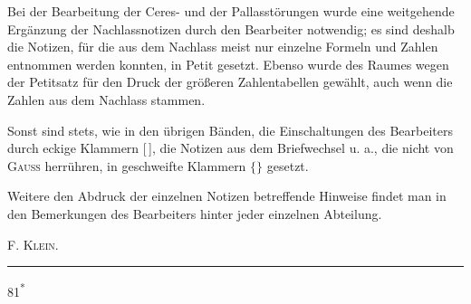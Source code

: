 \par\noindent\hspace*{\parindent}Bei der Bearbeitung der Ceres- und der Pallasstörungen wurde eine weitgehende Ergänzung der
Nachlassnotizen durch den Bearbeiter notwendig; es sind deshalb die Notizen, für die aus dem Nachlass
meist nur einzelne Formeln und Zahlen entnommen werden konnten, in Petit gesetzt. Ebenso wurde des
Raumes wegen der Petitsatz für den Druck der größeren Zahlentabellen gewählt, auch wenn die Zahlen aus
dem Nachlass stammen.

\par\noindent\hspace*{\parindent}Sonst sind stets, wie in den übrigen Bänden, die Einschaltungen des Bearbeiters durch eckige
Klammern [\,], die Notizen aus dem Briefwechsel u. a., die nicht von \textsc{Gauss} herrühren, in geschweifte
Klammern \(\bigl\{\bigr\}\) gesetzt.

\par\noindent\hspace*{\parindent}Weitere den Abdruck der einzelnen Notizen betreffende Hinweise findet man in den Bemerkungen
des Bearbeiters hinter jeder einzelnen Abteilung.
\begin{flushright}\textsc{F. Klein}.\end{flushright}
\par\begin{center}\rule{.24\linewidth}{.4pt}\end{center}
\noindent\hfill81\textsuperscript{*}\par
\clearpage
\endgroup
